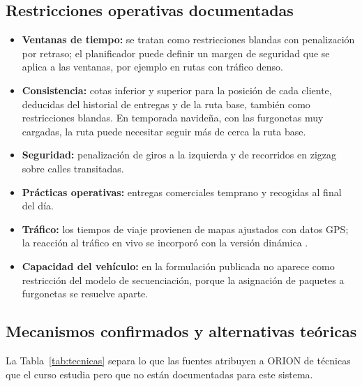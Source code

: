 \documentclass[11pt,a4paper]{article}
\begin{document}
\subsection{Restricciones operativas documentadas}
\begin{itemize}
  \item \textbf{Ventanas de tiempo:} se tratan como restricciones blandas con penalización por retraso; el planificador puede definir un margen de seguridad que se aplica a las ventanas, por ejemplo en rutas con tráfico denso.
  \item \textbf{Consistencia:} cotas inferior y superior para la posición de cada cliente, deducidas del historial de entregas y de la ruta base, también como restricciones blandas. En temporada navideña, con las furgonetas muy cargadas, la ruta puede necesitar seguir más de cerca la ruta base.
  \item \textbf{Seguridad:} penalización de giros a la izquierda y de recorridos en zigzag sobre calles transitadas.
  \item \textbf{Prácticas operativas:} entregas comerciales temprano y recogidas al final del día.
  \item \textbf{Tráfico:} los tiempos de viaje provienen de mapas ajustados con datos GPS; la reacción al tráfico en vivo se incorporó con la versión dinámica \parencite{ups2020}.
  \item \textbf{Capacidad del vehículo:} en la formulación publicada no aparece como restricción del modelo de secuenciación, porque la asignación de paquetes a furgonetas se resuelve aparte.
\end{itemize}

\subsection{Mecanismos confirmados y alternativas teóricas}
La Tabla~\ref{tab:tecnicas} separa lo que las fuentes atribuyen a ORION de técnicas que el curso estudia pero que no están documentadas para este sistema.
\end{document}
